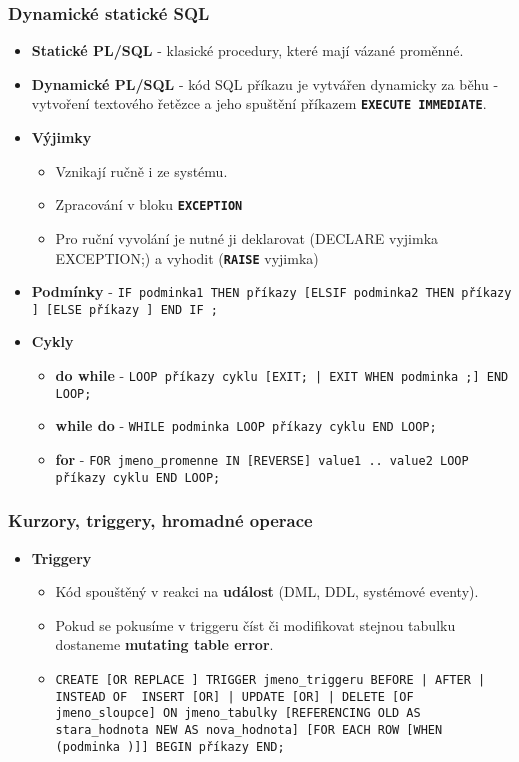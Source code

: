 \subsubsection{Dynamické statické SQL}
\begin{itemize}
\item \textbf{Statické PL/SQL} - klasické procedury, které mají vázané proměnné.
\item \textbf{Dynamické PL/SQL} - kód SQL příkazu je vytvářen dynamicky za běhu - vytvoření textového řetězce a jeho spuštění příkazem \textbf{\texttt{EXECUTE IMMEDIATE}}.
\item \textbf{Výjimky}
\begin{itemize}
\item Vznikají ručně i ze systému.
\item Zpracování v bloku \texttt{\textbf{EXCEPTION}}
\item Pro ruční vyvolání je nutné ji deklarovat (DECLARE vyjimka EXCEPTION;) a vyhodit (\textbf{\texttt{RAISE}} vyjimka)
\end{itemize}
\item \textbf{Podmínky} - \texttt{IF podminka1 THEN příkazy [ELSIF podminka2 THEN příkazy ] [ELSE příkazy ] END IF ;}
\item \textbf{Cykly}
\begin{itemize}
\item \textbf{do while} - \texttt{LOOP příkazy cyklu [EXIT; | EXIT WHEN podminka ;] END LOOP;}
\item \textbf{while do} - \texttt{WHILE podminka LOOP příkazy cyklu END LOOP;}
\item \textbf{for} - \texttt{FOR jmeno\_promenne IN [REVERSE] value1 .. value2 LOOP příkazy cyklu END LOOP;}
\end{itemize}
\end{itemize}


\subsubsection{Kurzory, triggery, hromadné operace}
\begin{itemize}
\item\textbf{Triggery}
\begin{itemize}
\item Kód spouštěný v reakci na \textbf{událost} (DML, DDL, systémové eventy).
\item Pokud se pokusíme v triggeru číst či modifikovat stejnou tabulku dostaneme \textbf{mutating table error}.
\item \texttt{CREATE [OR REPLACE ] TRIGGER jmeno\_triggeru {BEFORE | AFTER | INSTEAD OF } {INSERT [OR] | UPDATE [OR] | DELETE} [OF jmeno\_sloupce] ON jmeno\_tabulky [REFERENCING OLD AS stara\_hodnota NEW AS nova\_hodnota] [FOR EACH ROW [WHEN (podminka )]] BEGIN příkazy END;}
\end{itemize}
\end{itemize}



